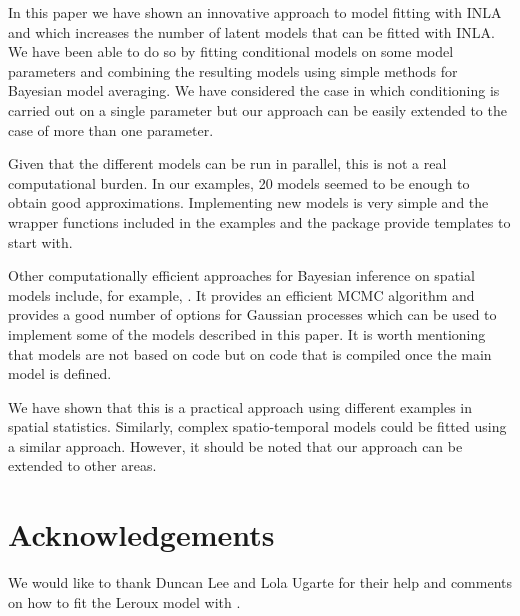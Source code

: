 \documentclass[article]{jss}
\begin{document}
In this paper we have shown an innovative approach to model fitting with INLA
and  which increases the number of latent models that can be fitted
with INLA. We have been able to do so by fitting conditional models on some
model parameters and combining the resulting models using simple methods for
Bayesian model averaging. We have considered the case in which conditioning is
carried out on a single parameter but our approach can be easily extended to the
case of more than one parameter.

Given that the different models can be run in parallel, this is not a real
computational burden. In our examples, 20 models seemed to be enough to obtain
good approximations. Implementing new models is very simple and the wrapper
functions included in the examples and the  package provide
templates to start with.

Other computationally efficient approaches for Bayesian inference on spatial 
models include, for example,  \citep{stan-software:2013}.
It provides an efficient MCMC algorithm and provides a good number of options
for Gaussian processes which can be used to implement some of the models
described in this paper. It is worth mentioning that  models are not
based on  code but on  code that is compiled once the main
model is defined.

We have shown that this is a practical approach using different examples in
spatial statistics. Similarly, complex spatio-temporal models could be fitted
using a similar approach. However, it should be noted that our approach can be
extended to other areas.

\section*{Acknowledgements}

We would like to thank Duncan Lee and Lola Ugarte for their help and comments
on how to fit the Leroux model with .


%

\end{document}
